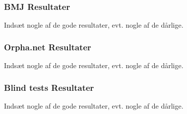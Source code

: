 \documentclass[xcolor=table]{beamer}
\begin{document}
\begin{frame}

  \frametitle{BMJ Resultater}

  Inds\ae t nogle af de gode resultater, evt. nogle af de d\aa rlige.

\end{frame}

\begin{frame}

  \frametitle{Orpha.net Resultater}

  Inds\ae t nogle af de gode resultater, evt. nogle af de d\aa rlige.

\end{frame}

\begin{frame}

  \frametitle{Blind tests Resultater}

  Inds\ae t nogle af de gode resultater, evt. nogle af de d\aa rlige.

\end{frame}
\end{document}
